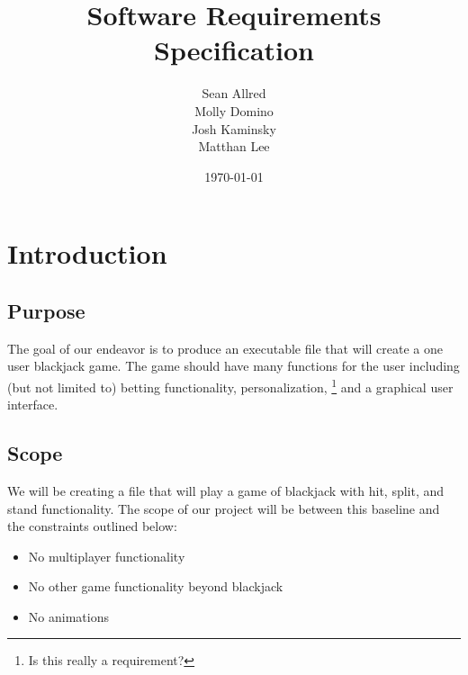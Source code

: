 \documentclass[12pt]{article}
\author{Sean Allred \\ Molly Domino \\ Josh Kaminsky \\ Matthan Lee}
\date{\today}
\title{Software Requirements Specification}
\begin{document}
\maketitle
\thispagestyle{empty}
\newpage
\null
\tableofcontents
\thispagestyle{empty}
\newpage
\null
\section{Introduction}

\subsection{Purpose}
The goal of our endeavor is to produce an executable file that will create a
one user blackjack game.  The game should have many functions for the user
including (but not limited to) betting functionality, personalization,
\footnote{Is this really a requirement?} and a graphical user interface.

\subsection{Scope}
We will be creating a file that will play a game of blackjack with hit, split,
and stand functionality. The scope of our project will be between this baseline
and the constraints outlined below:
\begin{itemize}
\item No multiplayer functionality
\item No other game functionality beyond blackjack
\item No animations
\end{itemize}
\end{document}
